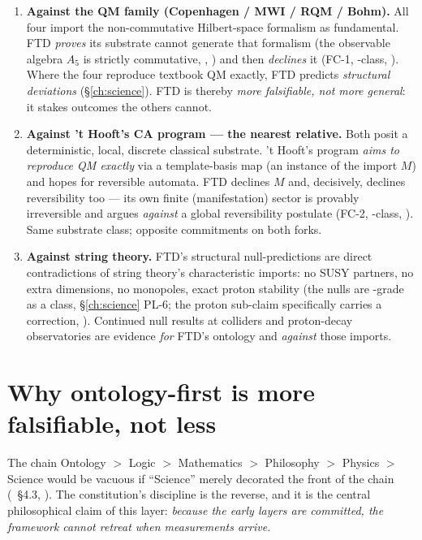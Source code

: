 \begin{enumerate}[leftmargin=1.6em,itemsep=4pt,topsep=2pt]
  \item \textbf{Against the QM family (Copenhagen / MWI / RQM / Bohm).} All four
    import the non-commutative Hilbert-space formalism as fundamental. FTD
    \emph{proves} its substrate cannot generate that formalism (the observable
    algebra $A_5$ is strictly commutative, , ) and then
    \emph{declines} it (FC-1, -class, ). Where the four
    reproduce textbook QM exactly, FTD predicts \emph{structural deviations}
    (\S\ref{ch:science}). FTD is thereby \emph{more falsifiable, not more
    general}: it stakes outcomes the others cannot.
  \item \textbf{Against 't Hooft's CA program --- the nearest relative.} Both
    posit a deterministic, local, discrete classical substrate. 't Hooft's
    program \emph{aims to reproduce QM exactly} via a template-basis map (an
    instance of the import $M$) and hopes for reversible automata. FTD declines
    $M$ and, decisively, declines reversibility too --- its own finite
    (manifestation) sector is provably irreversible and argues \emph{against} a
    global reversibility postulate (FC-2, -class, ). Same
    substrate class; opposite commitments on both forks.
  \item \textbf{Against string theory.} FTD's structural null-predictions are
    direct contradictions of string theory's characteristic imports: no SUSY
    partners, no extra dimensions, no monopoles, exact proton stability
    (the nulls are -grade as a class, \S\ref{ch:science} PL-6; the
    proton sub-claim specifically carries a  correction, ).
    Continued null results at colliders and proton-decay observatories are
    evidence \emph{for} FTD's ontology and \emph{against} those imports.
\end{enumerate}

\section{Why ontology-first is more falsifiable, not less}
\label{sec:phil-falsifiability}

The chain Ontology $>$ Logic $>$ Mathematics $>$ Philosophy $>$ Physics $>$
Science would be vacuous if ``Science'' merely decorated the front of the chain
(~\S4.3, ). The constitution's discipline is the reverse,
and it is the central philosophical claim of this layer: \emph{because the early
layers are committed, the framework cannot retreat when measurements arrive.}

